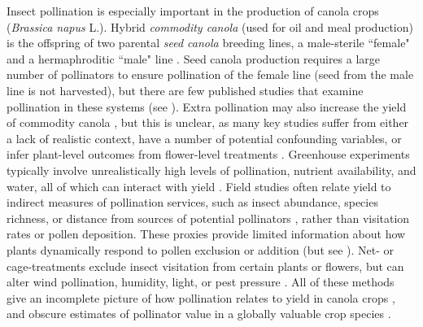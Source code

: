 \documentclass[12pt]{article} %
\begin{document}

Insect pollination is especially important in the production of canola crops (\textit{Brassica napus} L.).
Hybrid \emph{commodity canola} (used for oil and meal production) is the offspring of two parental \emph{seed canola} breeding lines, a male-sterile ``female" and a hermaphroditic ``male" line \citep{westcott2001,steffan2003,clay2009}. 
Seed canola production requires a large number of pollinators to ensure pollination of the female line (seed from the male line is not harvested), but there are few published studies that examine pollination in these systems (see \citealp{mesquida1981, mesquida1991}).
Extra pollination may also increase the yield of commodity canola \citep{morandin2005,rader_phd,bommarco2012,bartomeus2015,perrot2018}, but this is unclear, as many  key studies suffer from either a lack of realistic context, have a number of potential confounding variables, or infer plant-level outcomes from flower-level treatments \citep{ouvrard2019}. 
Greenhouse experiments typically involve unrealistically high levels of pollination, nutrient availability, and water, all of which can interact with yield \citep{bartomeus2015,marini2015}.
Field studies often relate yield to indirect measures of pollination services, such as insect abundance, species richness, or distance from sources of potential pollinators \citep{morandin2005,ricketts2008}, rather than visitation rates or pollen deposition.
These proxies provide limited information about how plants dynamically respond to pollen exclusion or addition (but see \citealp{sabbahi2005}).
Net- or cage-treatments exclude insect visitation from certain plants or flowers, but can alter wind pollination, humidity, light, or pest pressure \citep{olsson1960, neal2004, jauker2008}.
All of these methods give an incomplete picture of how pollination relates to yield in canola crops \citep{ouvrard2019}, and obscure estimates of pollinator value in a globally valuable crop species \citep{melathopoulos2015}.
\end{document}
